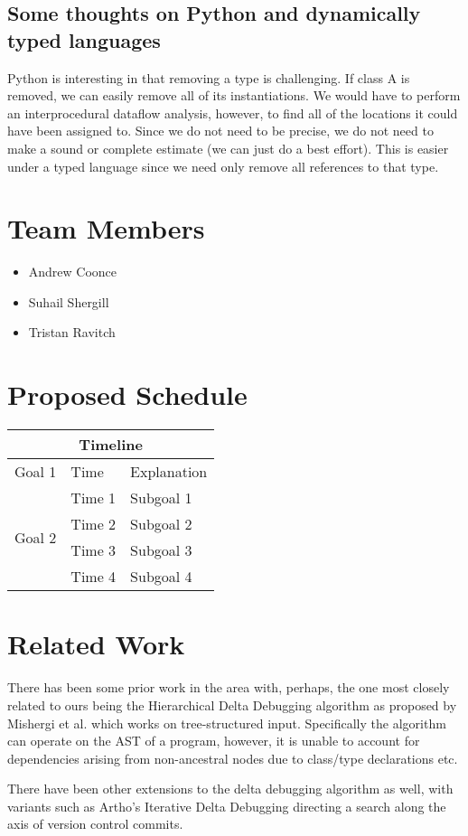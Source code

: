 \documentclass[11pt]{article}
\begin{document}
\subsection{Some thoughts on Python and dynamically typed languages}
Python is interesting in that removing a type is challenging. If class A is
removed, we can easily remove all of its instantiations. We would have to
perform an interprocedural dataflow analysis, however, to find all of the
locations it could have been assigned to. Since we do not need to be precise, we
do not need to make a sound or complete estimate (we can just do a best
effort). This is easier under a typed language since we need only remove all
references to that type.


\section{Team Members}
\begin{itemize}
\item{Andrew Coonce}
\item{Suhail Shergill}
\item{Tristan Ravitch}
\end{itemize}

\section{Proposed Schedule}
\begin{tabular}{|l|l|l|}
\hline
\multicolumn{3}{|c|}{Timeline} \\
\hline
Goal 1 & Time & Explanation \\ \hline
\multirow{4}{*}{Goal 2} & Time 1 & Subgoal 1 \\
 & Time 2 & Subgoal 2 \\
 & Time 3 & Subgoal 3 \\
 & Time 4 & Subgoal 4 \\ \hline
\end{tabular}



\section{Related Work}
There has been some prior work in the area with, perhaps, the one most closely
related to ours being the Hierarchical Delta Debugging algorithm as proposed by
Mishergi et al. \cite{hdd} which works on tree-structured input. Specifically
the algorithm can operate on the AST of a program, however, it is unable to
account for dependencies arising from non-ancestral nodes due to class/type
declarations etc.

There have been other extensions to the delta debugging algorithm as well, with
variants such as Artho's Iterative Delta Debugging \cite{idd} directing a search
along the axis of version control commits.



\end{document}
